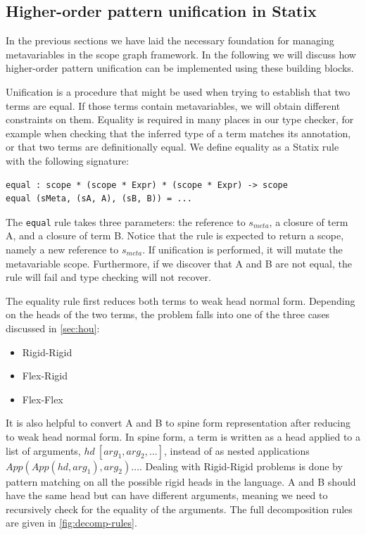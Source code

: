 \subsection{Higher-order pattern unification in Statix}
In the previous sections we have laid the necessary foundation for managing metavariables in the scope graph framework. In the following we will discuss how higher-order pattern unification can be implemented using these building blocks.\par
Unification is a procedure that might be used when trying to establish that two terms are equal. If those terms contain metavariables, we will obtain different constraints on them. Equality is required in many places in our type checker, for example when checking that the inferred type of a term matches its annotation, or that two terms are definitionally equal. We define equality as a Statix rule with the following signature:

\begin{lstlisting}[language=Statix]
equal : scope * (scope * Expr) * (scope * Expr) -> scope
equal (sMeta, (sA, A), (sB, B)) = ...
\end{lstlisting}

The \texttt{equal} rule takes three parameters: the reference to $s_{meta}$, a closure of term A, and a closure of term B. Notice that the rule is expected to return a scope, namely a new reference to $s_{meta}$. If unification is performed, it will mutate the metavariable scope. Furthermore, if we discover that A and B are not equal, the rule will fail and type checking will not recover. \par

The equality rule first reduces both terms to weak head normal form. Depending on the heads of the two terms, the problem falls into one of the three cases discussed in \cref{sec:hou}:
\begin{itemize}
  \item Rigid-Rigid
  \item Flex-Rigid
  \item Flex-Flex
\end{itemize}
It is also helpful to convert A and B to spine form representation after reducing to weak head normal form. In spine form, a term is written as a head applied to a list of arguments,
$hd\ [arg_1, arg_2, \dots]$, instead of as nested applications
$App(App(hd, arg_1), arg_2)\dots$. 
Dealing with Rigid-Rigid problems is done by pattern matching on all the possible rigid heads in the language. A and B should have the same head but can have different arguments, meaning we need to recursively check for the equality of the arguments. The full decomposition rules are given in \cref{fig:decomp-rules}.

